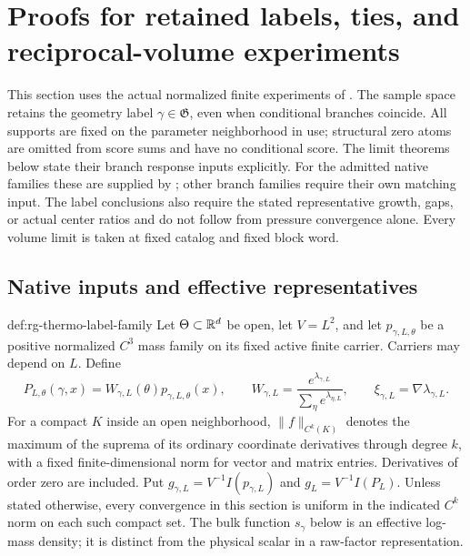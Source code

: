 
\section{Proofs for retained labels, ties, and reciprocal-volume experiments}
\label{sec:rg-thermo-label-proof}

This section uses the actual normalized finite experiments of
. The sample space retains the
geometry label $\gamma\in\mathfrak G$, even when conditional branches
coincide. All supports are fixed on the parameter neighborhood in use;
structural zero atoms are omitted from score sums and have no conditional
score. The limit theorems below state their branch response inputs explicitly.
For the admitted native families these are supplied by
; other branch families require their
own matching input. The label conclusions also require the stated
representative growth, gaps, or actual center ratios and do not follow
from pressure convergence alone. Every volume limit is taken at fixed
catalog and fixed block word.\thermoestablishedstatus


\subsection{Native inputs and effective representatives}
\label{sec:rg-thermo-label-inputs}

{def:rg-thermo-label-family}
Let $\Theta\subset\mathbb R^d$ be open, let $V=L^2$, and let
$p_{\gamma,L,\theta}$ be a positive normalized $C^3$ mass family on its
fixed active finite carrier. Carriers may depend on $L$. Define
\begin{equation}
 P_{L,\theta}(\gamma,x)=W_{\gamma,L}(\theta)p_{\gamma,L,\theta}(x),
 \qquad
 W_{\gamma,L}=\frac{e^{\lambda_{\gamma,L}}}
 {\sum_\eta e^{\lambda_{\eta,L}}},
 \qquad
 \xi_{\gamma,L}=\nabla\lambda_{\gamma,L}.
 \label{eq:rg-thermo-label-family}
\end{equation}
For a compact $K$ inside an open neighborhood, $\|f\|_{C^k(K)}$ denotes
the maximum of the suprema of its ordinary coordinate derivatives
through degree $k$, with a fixed finite-dimensional norm for vector and
matrix entries. Derivatives of order zero are included. Put
$g_{\gamma,L}=V^{-1}I(p_{\gamma,L})$ and
$g_L=V^{-1}I(P_L)$. Unless stated otherwise, every convergence in this
section is uniform in the indicated $C^k$ norm on each such compact set.
The bulk function $s_\gamma$ below is an effective log-mass density; it
is distinct from the physical scalar in a raw-factor representation.

